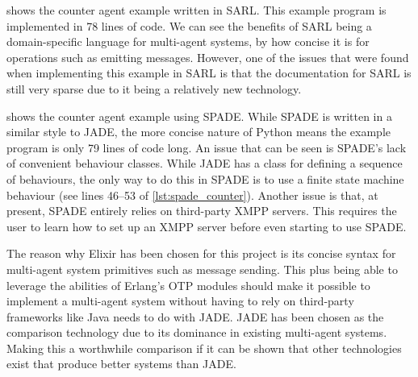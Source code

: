  shows the counter agent example written in SARL\@.
This example program is implemented in 78 lines of code.
We can see the benefits of SARL being a domain-specific language for multi-agent systems, by how concise it is for operations such as emitting messages.
However, one of the issues that were found when implementing this example in SARL is that the documentation for SARL is still very sparse due to it being a relatively new technology.

 shows the counter agent example using SPADE\@.
While SPADE is written in a similar style to JADE, the more concise nature of Python means the example program is only 79 lines of code long.
An issue that can be seen is SPADE's lack of convenient behaviour classes.
While JADE has a class for defining a sequence of behaviours, the only way to do this in SPADE is to use a finite state machine behaviour (see lines 46--53 of \cref{lst:spade_counter}).
Another issue is that, at present, SPADE entirely relies on third-party XMPP servers.
This requires the user to learn how to set up an XMPP server before even starting to use SPADE\@.

The reason why Elixir has been chosen for this project is its concise syntax for multi-agent system primitives such as message sending.
This plus being able to leverage the abilities of Erlang's OTP modules should make it possible to implement a multi-agent system without having to rely on third-party frameworks like Java needs to do with JADE\@.
JADE has been chosen as the comparison technology due to its dominance in existing multi-agent systems.
Making this a worthwhile comparison if it can be shown that other technologies exist that produce better systems than JADE\@.
